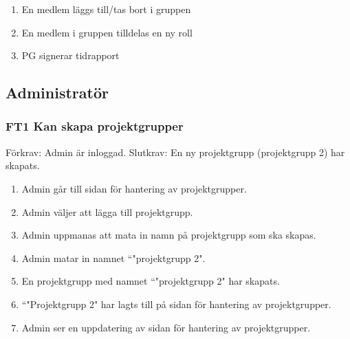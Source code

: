 \documentclass[paper=a4, fontsize=11pt,twoside]{article}
\begin{document}
\begin{enumerate}
  \item En medlem läggs till/tas bort i gruppen
  \item      En medlem i gruppen tilldelas en ny roll
  \item      PG signerar tidrapport
\end{enumerate}


\subsection{Administratör}

\subsubsection*{FT1 Kan skapa projektgrupper}
Förkrav: Admin är inloggad.
\newline
Slutkrav:  En ny projektgrupp (projektgrupp 2) har skapats.

\begin{enumerate}
	\item Admin går till sidan för hantering av projektgrupper.
	\item Admin väljer att lägga till projektgrupp.
	\item Admin uppmanas att mata in namn på projektgrupp som ska skapas.
	\item Admin matar in namnet ``"projektgrupp 2".
	\item En projektgrupp med namnet ``"projektgrupp 2" har skapats.
	\item ``"Projektgrupp 2" har lagts till på sidan för hantering av
	projektgrupper.
	\item Admin ser en uppdatering av sidan för hantering av projektgrupper.
\end{enumerate}
\end{document}
